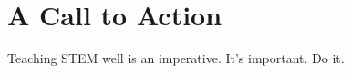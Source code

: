 
\section{A Call to Action}
\label{sec:call-action}

Teaching STEM well is an imperative.  It's important.  Do it.


